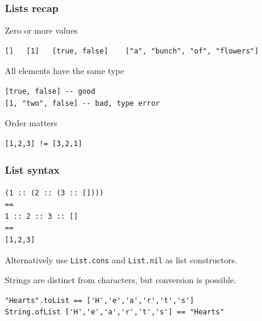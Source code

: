 \documentclass{beamer}
\subtitle{More about lists}
\begin{document}
\begin{frame}
  \titlepage
\end{frame}
\begin{frame}[fragile]
  \frametitle{Lists recap}
  \begin{block}{Zero or more values}
\begin{verbatim}
[]   [1]   [true, false]    ["a", "bunch", "of", "flowers"]
\end{verbatim}
  \end{block}
  \begin{block}{All elements have the same type}
\begin{verbatim}
[true, false] -- good
[1, "two", false] -- bad, type error
\end{verbatim}
  \end{block}
  \begin{block}{Order matters}
\begin{verbatim}
[1,2,3] != [3,2,1]
\end{verbatim}
  \end{block}
\end{frame}
\begin{frame}[fragile]
  \frametitle{List syntax}
\begin{lstlisting}
(1 :: (2 :: (3 :: []))) 
==
1 :: 2 :: 3 :: [] 
==
[1,2,3]
\end{lstlisting}
  Alternatively use \lstinline|List.cons| and \lstinline|List.nil| as list constructors.
  
  Strings are distinct from characters, but conversion is possible.
\begin{lstlisting}
"Hearts".toList == ['H','e','a','r','t','s']
String.ofList ['H','e','a','r','t','s'] == "Hearts"
\end{lstlisting}
\end{frame}
\end{document}
